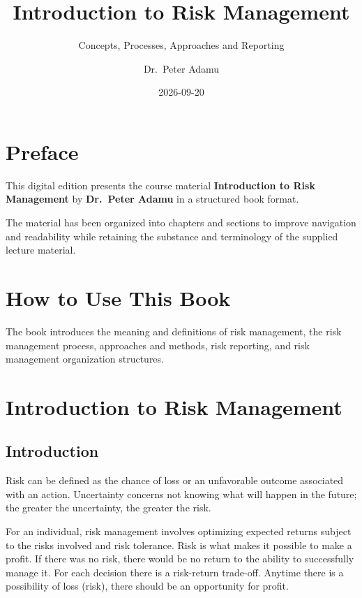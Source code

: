 \documentclass[
]{book}
\title{Introduction to Risk Management}
\subtitle{Concepts, Processes, Approaches and Reporting}
\author{Dr.~Peter Adamu}
\date{2026-09-20}
\begin{document}
\maketitle

{
\setcounter{tocdepth}{1}
\tableofcontents
}
\chapter*{Preface}\label{preface}

This digital edition presents the course material \textbf{Introduction to Risk Management} by \textbf{Dr.~Peter Adamu} in a structured book format.

The material has been organized into chapters and sections to improve navigation and readability while retaining the substance and terminology of the supplied lecture material.

\chapter*{How to Use This Book}\label{how-to-use-this-book}

The book introduces the meaning and definitions of risk management, the risk management process, approaches and methods, risk reporting, and risk management organization structures.

\chapter{Introduction to Risk Management}\label{introduction-to-risk-management}

\section{Introduction}\label{introduction}

Risk can be defined as the chance of loss or an unfavorable outcome associated with an action. Uncertainty concerns not knowing what will happen in the future; the greater the uncertainty, the greater the risk.

For an individual, risk management involves optimizing expected returns subject to the risks involved and risk tolerance. Risk is what makes it possible to make a profit. If there was no risk, there would be no return to the ability to successfully manage it. For each decision there is a risk-return trade-off. Anytime there is a possibility of loss (risk), there should be an opportunity for profit.
\end{document}
